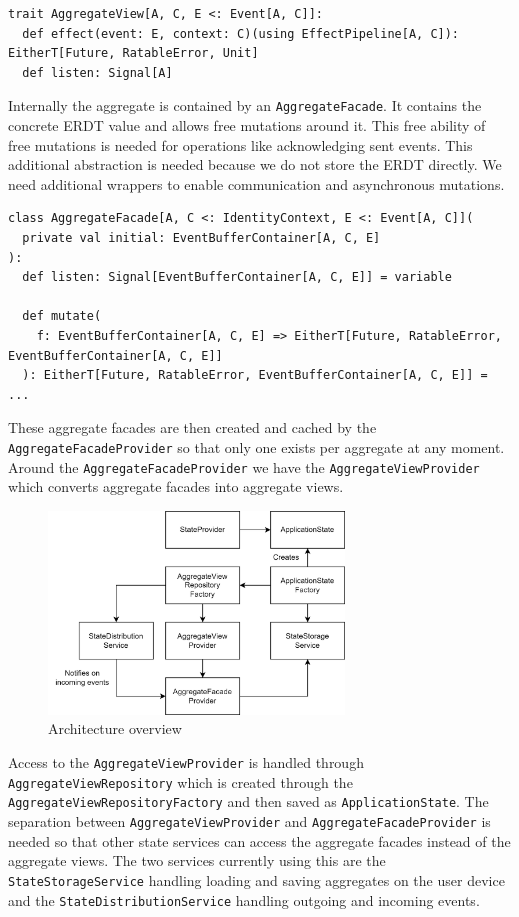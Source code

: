 \documentclass[
	english,
	ruledheaders=section,   %
	class=report,		    %
	thesis={type=bachelor}, %
	accentcolor=9c,			%
	custommargins=true,    %
	marginpar=false,        %
	parskip=half-,          %
	fontsize=11pt,          %
]{tudapub}
\begin{document}
\begin{lstlisting}
trait AggregateView[A, C, E <: Event[A, C]]:
  def effect(event: E, context: C)(using EffectPipeline[A, C]): EitherT[Future, RatableError, Unit]
  def listen: Signal[A]
\end{lstlisting}

Internally the aggregate is contained by an \texttt{AggregateFacade}. It contains the concrete ERDT value and allows free mutations around it. This free ability of free mutations is needed for operations like acknowledging sent events. This additional abstraction is needed because we do not store the ERDT directly. We need additional wrappers to enable communication and asynchronous mutations. 

\begin{lstlisting}
class AggregateFacade[A, C <: IdentityContext, E <: Event[A, C]](
  private val initial: EventBufferContainer[A, C, E]
):
  def listen: Signal[EventBufferContainer[A, C, E]] = variable

  def mutate(
    f: EventBufferContainer[A, C, E] => EitherT[Future, RatableError, EventBufferContainer[A, C, E]]
  ): EitherT[Future, RatableError, EventBufferContainer[A, C, E]] = ...

\end{lstlisting}

These aggregate facades are then created and cached by the \texttt{AggregateFacadeProvider} so that only one exists per aggregate at any moment. Around the \texttt{AggregateFacadeProvider} we have the \texttt{AggregateViewProvider} which converts aggregate facades into aggregate views. 

\begin{figure}[h]
  \centering
  \includegraphics[width=0.7\textwidth]{state.png}
  \caption{Architecture overview}
\end{figure}

Access to the \texttt{AggregateViewProvider} is handled through \texttt{AggregateViewRepository} which is created through the \texttt{AggregateViewRepositoryFactory} and then saved as \texttt{ApplicationState}. The separation between \texttt{AggregateViewProvider} and \texttt{AggregateFacadeProvider} is needed so that other state services can access the aggregate facades instead of the aggregate views. The two services currently using this are the \texttt{StateStorageService} handling loading and saving aggregates on the user device and the \texttt{StateDistributionService} handling outgoing and incoming events. 
\end{document}
